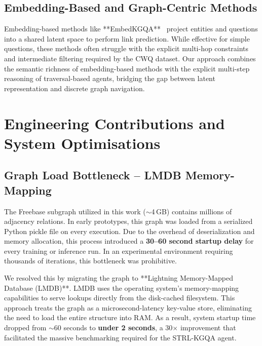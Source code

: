 \documentclass[11pt,a4paper]{article}
\newcommand{\STRL}{\textsc{STRL-KGQA}}
\begin{document}
\subsection{Embedding-Based and Graph-Centric Methods}
Embedding-based methods like **EmbedKGQA**~\cite{saxena2020improving} project
entities and questions into a shared latent space to perform link prediction.
While effective for simple questions, these methods often struggle with the
explicit multi-hop constraints and intermediate filtering required by the
CWQ dataset. Our approach combines the semantic richness of embedding-based
methods with the explicit multi-step reasoning of traversal-based agents,
bridging the gap between latent representation and discrete graph navigation.


\section{Engineering Contributions and System Optimisations}
\label{sec:engineering}

\subsection{Graph Load Bottleneck -- LMDB Memory-Mapping}
The Freebase subgraph utilized in this work ($\sim$4\,GB) contains millions of
adjacency relations.
In early prototypes, this graph was loaded from a serialized Python pickle
file on every execution.
Due to the overhead of deserialization and memory allocation, this process
introduced a \textbf{30--60 second startup delay} for every training or
inference run.
In an experimental environment requiring thousands of iterations, this
bottleneck was prohibitive.

We resolved this by migrating the graph to **Lightning Memory-Mapped Database
(LMDB)**.
LMDB uses the operating system's memory-mapping capabilities to serve lookups
directly from the disk-cached filesystem.
This approach treats the graph as a microsecond-latency key-value store,
eliminating the need to load the entire structure into RAM.
As a result, system startup time dropped from $\sim$60 seconds to \textbf{under
2 seconds}, a 30$\times$ improvement that facilitated the massive benchmarking
required for the \STRL{} agent.
\end{document}

